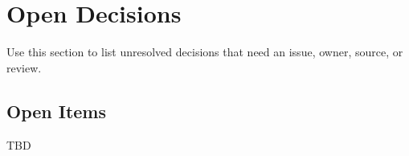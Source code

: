 \chapter{Open Decisions}

Use this section to list unresolved decisions that need an issue, owner, source, or review.

\section{Open Items}

TBD
